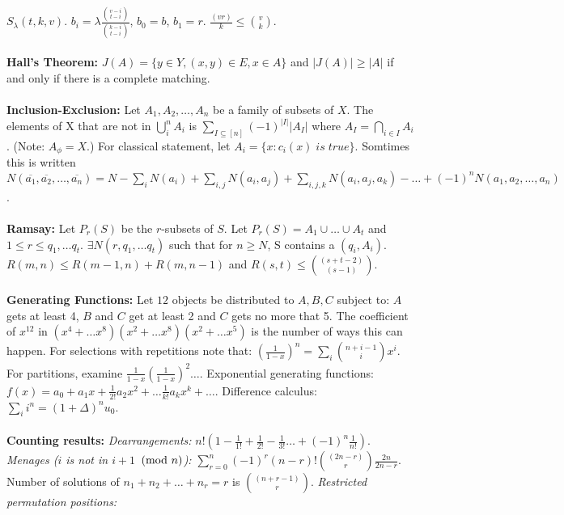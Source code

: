 $S_{\lambda}(t, k, v)$.
$b_i = \lambda
{\frac
{{{v-i} \choose {t-i}}}
{{{k-i} \choose {t-i}}}
}$,
$b_0 =b$,
$b_1 = r$.
${\frac {(vr)} {k}} \leq {{v} \choose {k}}$.
\\
\\
{\bf Hall's Theorem:} $J(A)= \{ y \in Y, (x,y) \in E, x \in A \}$
and $|J(A)| \geq |A|$ if and only if there is a complete matching.
\\
\\
{\bf Inclusion-Exclusion:}  Let $A_1 , A_2 , \ldots , A_n$ be a family of 
subsets of $X$.  The elements
of X that are not in $\bigcup_i^n A_i$ is
$\sum_{I \subseteq [n]} (-1)^{| I | } |A_I |$ where
$A_I = \bigcap_{i \in I} A_i$. (Note:
$A_{\phi}= X$.)  For classical statement, let $A_i = \{ x: c_i (x)
\; is \; true\}$.  Somtimes this is written
$N({\overline {a_1}}, {\overline {a_2}}, \ldots ,{\overline {a_n}})= N - \sum_i N(a_i) + \sum_{i,j} N(a_i , a_j) + \sum_{i,j,k} N(a_i , a_j , a_k) - 
\ldots +(-1)^n N(a_1, a_2,\ldots, a_n)$.
\\
\\
{\bf Ramsay:} Let $P_{r}(S)$ be the $r$-subsets of $S$.
Let $P_{r}(S)= A_{1} \cup \ldots \cup A_{t}$ and $1 \leq r \leq q_{1},\ldots
q_{t}$.
$\exists N(r, q_{1},\ldots q_{t})$ such that for $n \geq N$, S contains a
$(q_{i},A_{i})$.
$R(m,n) \leq R(m-1, n) + R(m, n-1)$ and $R(s,t) \leq {(s+t-2) \choose
(s-1)}$.
\\
\\
{\bf Generating Functions:} Let $12$ objects be distributed to $A, B, C$ subject
to: $A$ gets at least 4, $B$ and $C$ get at least 2 and $C$ gets no more
that 5.  The coefficient of $x^{12}$ in
$(x^4 + \ldots x^8 ) (x^2 + \ldots x^8 ) (x^2 + \ldots x^5 )$ is the number
of ways this can happen.
For selections with repetitions note that:
$({\frac {1} {1-x}})^n = \sum_i {{n+i-1} \choose {i}} x^i$.  For partitions,
examine
$ {\frac {1} {1-x}}({\frac {1} {1-x}})^2 \ldots$.
Exponential generating functions:
$f(x)= a_0 + a_1 x +
{\frac {1} {2!}} a_2 x^2 + \ldots
{\frac {1} {k!}} a_k x^k  + \ldots$.
Difference calculus: $\sum_i i^n = (1+ \Delta )^n u_0$.
\\
\\
{\bf Counting results:}
\emph{Dearrangements:} $n! ( 1 - {\frac 1 {1!}} +{\frac 1 {2!}} -{\frac 1 {3!}}
\ldots + (-1)^{n} {\frac 1 {n!}})$. 
\emph{Menages ($i$ is not in $i+1$ $\thinspace \textnormal{(mod } n \textnormal{)}$):}
$\sum_{r=0}^{n} (-1)^{r} (n-r)! {(2n-r) \choose r} {\frac {2n} {2n-r}}$.
Number of solutions of 
$n_1 + n_2 + \ldots + n_r = r$ is ${(n+r-1) \choose r}$.
\emph{Restricted permutation positions:}

